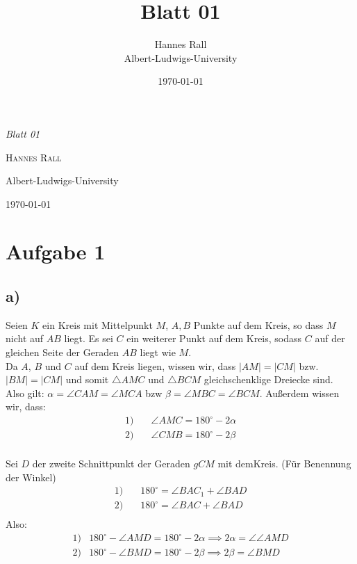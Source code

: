 \documentclass[12pt,a4paper]{article}
\title{Blatt 01}
\author{Hannes Rall \\ Albert-Ludwigs-University}
\date{\today}
\begin{document}
 
\begin{titlepage}     
    \centering     
    \vspace*{2cm}     
    {\Huge\itshape Blatt 01\par}     
    \vspace{2cm}     
    {\Large\textsc{Hannes Rall}\par}     
    \vfill     
    {\large Albert-Ludwigs-University\\}     
    \vspace{1cm}     
    {\large\today\par}
\end{titlepage}

\newpage
\section*{Aufgabe 1} 
\subsection*{a)} 
Seien $K$ ein Kreis mit Mittelpunkt $M$, $A,B$ Punkte auf dem Kreis, so dass $M$ nicht auf $AB$ liegt. Es sei $C$ ein weiterer Punkt auf dem Kreis, sodass $C$ auf der gleichen Seite der Geraden $AB$ liegt wie $M$.\\

\noindent Da $A$, $B$ und $C$ auf dem Kreis liegen, wissen wir, dass $|AM| = |CM|$ bzw. $|BM| = |CM|$ und somit $\triangle AMC$ und $\triangle BCM$ gleichschenklige Dreiecke sind.\\

\noindent Also gilt: $\alpha = \angle CAM = \angle MCA$ bzw $\beta = \angle MBC = \angle BCM$. Außerdem wissen wir, dass: 
\begin{align*} 
    1) & \quad \angle AMC = 180^\circ - 2\alpha \\ 
    2) & \quad \angle CMB = 180^\circ - 2\beta \\ 
\end{align*} 

\noindent Sei $D$ der zweite Schnittpunkt der Geraden $gCM$ mit demKreis. (Für Benennung der Winkel) 
\begin{align*} 
    1) & \quad 180^\circ = \angle BAC_1 + \angle BAD \\ 
    2) & \quad 180^\circ = \angle BAC + \angle BAD \\ 
\end{align*} 
Also: 
\begin{align*}
    1) & 180^\circ - \angle AMD = 180^\circ - 2\alpha \implies 2 \alpha = \angle \angle AMD \\
    2) & 180^\circ - \angle BMD = 180^\circ - 2\beta \implies 2\beta = \angle BMD \\
\end{align*}
\end{document}
